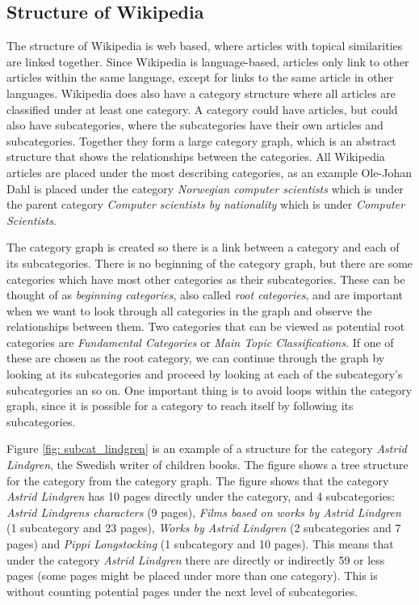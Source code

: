 \subsection{Structure of Wikipedia}
The structure of Wikipedia is web based, where articles with topical similarities are linked together. Since Wikipedia is language-based, articles only link to other articles within the same language, except for links to the same article in other languages. Wikipedia does also have a category structure where all articles are classified under at least one category. A category could have articles, but could also have subcategories, where the subcategories have their own articles and subcategories. Together they form a large category graph, which is an abstract structure that shows the relationships between the categories. All Wikipedia articles are placed under the most describing categories, as an example Ole-Johan Dahl 
is placed under the category \emph{Norwegian computer scientists} which is under the parent category \emph{Computer scientists by nationality} which is under \emph{Computer Scientists}. 

The category graph is created so there is a link between a category and each of its subcategories. There is no beginning of the category graph, but there are some categories which have most other categories as their subcategories. These can be thought of as \emph{beginning categories}, also called \emph{root categories}, and are important when we want to look through all categories in the graph and observe the relationships between them.  Two categories that can be viewed as potential root categories are \emph{Fundamental Categories} or \emph{Main Topic Classifications}. If one of these are chosen as the root category, we can continue through the graph by looking at its subcategories and proceed by looking at each of the subcategory's subcategories an so on. One important thing is to avoid loops within the category graph, since it is possible for a category to reach itself by following its subcategories.

Figure \ref{fig: subcat_lindgren} is an example of a structure for the category \emph{Astrid Lindgren}, the Swedish writer of children books. The figure shows a tree structure for the category from the category graph. The figure shows that the category \emph{Astrid Lindgren} has 10 pages directly under the category, and 4 subcategories: \emph{Astrid Lindgrens characters} (9 pages), \emph{Films based on works by Astrid Lindgren} (1 subcategory and 23 pages), \emph{Works by Astrid Lindgren} (2 subcategories and 7 pages) and \emph{Pippi Longstocking} (1 subcategory and 10 pages).  This means that under the category \emph{Astrid Lindgren} there are directly or indirectly 59 or less pages (some pages might be placed under more than one category). This is without counting potential pages under the next level of subcategories. 


